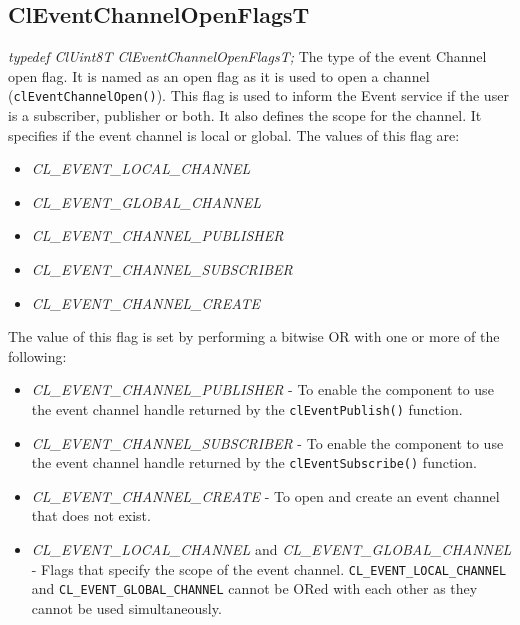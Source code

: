 \begin{flushleft}
\subsection{ClEventChannelOpenFlagsT}
\textit{typedef ClUint8T ClEventChannelOpenFlagsT;}
\newline
\newline
The type of the event Channel open flag. It is named as an open flag as it is used to open a channel ({\tt{clEventChannelOpen()}}). This flag is used
to inform the Event service if the user is a subscriber, publisher or both. It also defines the scope for the channel. It specifies if the event channel is 
local or global. The values of this flag are:
\begin{itemize}
\item
\textit{CL\_\-EVENT\_\-LOCAL\_\-CHANNEL}
\item
\textit{CL\_\-EVENT\_\-GLOBAL\_\-CHANNEL}
\item
\textit{CL\_\-EVENT\_\-CHANNEL\_\-PUBLISHER}
\item
\textit{CL\_\-EVENT\_\-CHANNEL\_\-SUBSCRIBER}
\item
\textit{CL\_\-EVENT\_\-CHANNEL\_\-CREATE}
\end{itemize}
The value of this flag is set by performing a bitwise OR with one or more of the following:
\begin{itemize}
\item
\textit{CL\_\-EVENT\_\-CHANNEL\_\-PUBLISHER} - To enable the component to use the event channel handle returned by the {\tt{clEventPublish()}} function. 
\item
\textit{CL\_\-EVENT\_\-CHANNEL\_\-SUBSCRIBER} - To enable the component to use the event channel handle returned by the {\tt{clEventSubscribe()}} function.
\item
\textit{CL\_\-EVENT\_\-CHANNEL\_\-CREATE} - To open and create an event channel that does not exist. 
\item
\textit{CL\_\-EVENT\_\-LOCAL\_\-CHANNEL} and \textit{CL\_\-EVENT\_\-GLOBAL\_\-CHANNEL} - Flags that specify the scope of the event channel. 
{\tt{CL\_\-EVENT\_\-LOCAL\_\-CHANNEL}} and {\tt{CL\_\-EVENT\_\-GLOBAL\_\-CHANNEL}} cannot be ORed with each other as they cannot be used simultaneously.
\end{itemize}



\end{flushleft}
